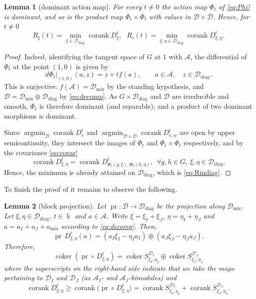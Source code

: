 \documentclass[12pt]{article}
\def\xspace{ }%
\newtheorem{lemma}[lemma]{Lemma}
\theoremstyle{definition}
\newcommand{\prigity}{pseudorigidity\xspace}
\newcommand{\argmin}{\operatorname{argmin}}
\newcommand{\mix}{\mathrm{mix}}   %
\newcommand{\diag}{\mathrm{diag}} %
\newcommand{\pr}{\operatorname{pr}}
\newcommand{\kk}{\Bbbk}
\newcommand{\alg}{\mathcal{A}}   %
\newcommand{\bmdl}{\mathcal{D}}   %
\newcommand{\Sop}{S}
\newcommand{\Dop}{D}
\newcommand{\rsub}{\sharp}       %
\newcommand{\psub}{\flat}        %
\newcommand{\cork}{\operatorname{corank}}
\newcommand{\coker}{\operatorname{coker}}
\begin{document}
\begin{lemma}[dominant action map]\label{lem:dom}
For every $t \ne 0$ the action map $\Phi_t$ of \eqref{eq:Phi} is
dominant, and so is the product map
$\Phi_t\times\Phi_t$ with values in $\bmdl\times\bmdl$. Hence, for $t\ne0$
\begin{equation} \label{eq:Rindiag}
R_\rsub(t) =  \min_{\xi \in \bmdl_{\diag}}\cork \Dop^t_\xi,\ \ \ R_\psub(t) = \min_{\xi,\eta \in \bmdl_{\diag}}\cork \Dop^t_{\xi,\eta}.
\end{equation}
\end{lemma}

\begin{proof}
Indeed, identifying the tangent space of $G$ at $1$ with $\alg$,
the differential of $\Phi_t$ at the point $(1,0)$ is given by
\begin{equation}\label{eq:dPhi}
   d\Phi_t|_{(1,0)}(a,z) = z + tf(a), \qquad a \in \alg,\quad z \in
   \bmdl_{\diag} .
\end{equation}
This is surjective: $f(\alg) = \bmdl_{\mix}$ by the standing
hypothesis, and $\bmdl =\bmdl_{\mix}\oplus\bmdl_{\diag}$ by \eqref{eq:decomp}. As
$G\times\bmdl_{\diag}$ and $\bmdl$ are irreducible and smooth, $\Phi_t$ is therefore
dominant (and separable); and a product of two dominant morphisms is dominant.

Since $\argmin_{\bmdl}\cork \Dop^t_v$ and $\argmin_{\bmdl\times\bmdl}\cork \Dop^t_{v,w}$ are open
by upper semicontinuity, they intersect the images of $\Phi_t$ and $\Phi_t\times\Phi_t$ respectively, and by the covariance \eqref{eq:covar}
\[
\cork \Dop^t_{\xi,\eta}=\cork \Dop^t_{\Phi_t(g,\xi),\Phi_t(h,\eta)},\ \ \forall g,h\in G,\ \xi,\eta\in \bmdl_{\diag}.
\]
Hence, the minimum is already attained on $\bmdl_{\diag}$, which is
\eqref{eq:Rindiag}.
\end{proof}

To finish the proof of  it remains to observe the following.

\begin{lemma}[block projection]\label{lem:blockproj}
Let $\pr : \bmdl \to \bmdl_{\diag}$ be the projection along
$\bmdl_{\mix}$. Let $\xi, \eta \in \bmdl_{\diag}$, $t \in \kk$ and
$a \in \alg$. Write $\xi = \xi_I + \xi_J$, $\eta = \eta_I + \eta_J$ and
$a = a_I + a_J + a_{\mix}$ according to \eqref{eq:decomp}. Then,
\begin{equation}\label{eq:blockcomp}
   \pr\,\Dop^t_{\xi,\eta}(a) = (a_I\xi_I - \eta_Ia_I)\oplus
   (a_J\xi_J - \eta_Ja_J) .
\end{equation}
Therefore,
\[
\coker(\pr\circ\,\Dop^t_{\xi,\eta}) = \coker
\Sop^{\bmdl_I}_{\xi_I,\eta_I}\oplus\coker \Sop^{\bmdl_J}_{\xi_J,\eta_J}
\]
where the superscripts on the right-hand side indicate that we take the maps pertaining to $\bmdl_I$ and $\bmdl_J$
(as $\alg_I$- and $\alg_J$-bimodules) and
\begin{equation}\label{eq:prbound}
   \cork \Dop^t_{\xi,\eta}\ge\cork\bigl(\pr\circ\,\Dop^t_{\xi,\eta}\bigr) =
   \cork \Sop^{\bmdl_I}_{\xi_I,\eta_I} + \cork \Sop^{\bmdl_J}_{\xi_J,\eta_J}.
\end{equation}
\end{lemma}
\end{document}
